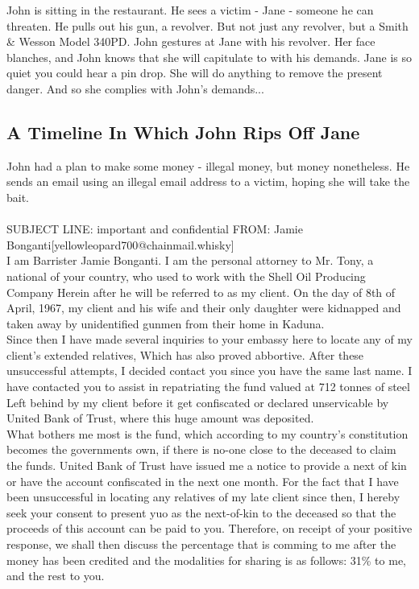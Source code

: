\documentclass{article}
\begin{document}
John is sitting in the restaurant.
He sees a victim {-} Jane {-} someone he can threaten. He pulls out his gun, a revolver.
But not just any revolver, but a Smith \& Wesson Model 340PD.
John gestures at Jane with his revolver. Her face blanches, and John knows that she will capitulate to with his demands.
Jane is so quiet you could hear a pin drop. She will do anything to remove the present danger. And so she complies with John's demands...
\subsection{A Timeline In Which John Rips Off Jane}


John had a plan to make some money {-} illegal money, but money nonetheless.
He sends an email using an illegal email address to a victim, hoping she will take the bait.
\\\\
SUBJECT LINE: important and confidential
FROM: Jamie Bonganti[yellowleopard700@chainmail.whisky]
\\
I am Barrister Jamie Bonganti.
I am the personal attorney to Mr. Tony, a national of your country, who used to work with the Shell Oil Producing Company
Herein after he will be referred to as my client.
On the day of 8th of April, 1967, my client and his wife and their only daughter were kidnapped and taken away by unidentified gunmen from their home in Kaduna.
\\
Since then I have made several inquiries to your embassy here to locate any of my client's extended relatives, Which has also proved abbortive.
After these unsuccessful attempts, I decided contact you since you have the same last name.
I have contacted you to assist in repatriating the fund valued at 712 tonnes of steel Left behind by my client before it get confiscated or declared unservicable by United Bank of Trust, where this huge amount was deposited.
\\
What bothers me most is the fund, which according to my country's constitution becomes the governments own, if there is no{-}one close to the deceased to claim the funds.
United Bank of Trust have issued me a notice to provide a next of kin or have the account confiscated in the next one month.
For the fact that I have been unsuccessful in locating any relatives of my late client since then, I hereby seek your consent to present yuo as the next{-}of{-}kin to the deceased so that the proceeds of this account can be paid to you.
Therefore, on receipt of your positive response, we shall then discuss the percentage that is comming to me after the money has been credited and the modalities for sharing is as follows: 31\% to me, and the rest to you.
\end{document}
